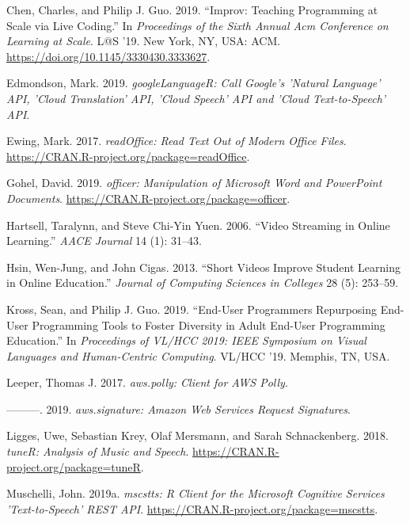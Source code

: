 \leavevmode\hypertarget{ref-ChenLAS2019}{}%
Chen, Charles, and Philip J. Guo. 2019. ``Improv: Teaching Programming
at Scale via Live Coding.'' In \emph{Proceedings of the Sixth Annual Acm
Conference on Learning at Scale}. L@S '19. New York, NY, USA: ACM.
\url{https://doi.org/10.1145/3330430.3333627}.

\leavevmode\hypertarget{ref-googleLanguageR}{}%
Edmondson, Mark. 2019. \emph{googleLanguageR: Call Google's 'Natural
Language' API, 'Cloud Translation' API, 'Cloud Speech' API and 'Cloud
Text-to-Speech' API}.

\leavevmode\hypertarget{ref-readOffice}{}%
Ewing, Mark. 2017. \emph{readOffice: Read Text Out of Modern Office
Files}. \url{https://CRAN.R-project.org/package=readOffice}.

\leavevmode\hypertarget{ref-officer}{}%
Gohel, David. 2019. \emph{officer: Manipulation of Microsoft Word and
PowerPoint Documents}. \url{https://CRAN.R-project.org/package=officer}.

\leavevmode\hypertarget{ref-hartsell2006video}{}%
Hartsell, Taralynn, and Steve Chi-Yin Yuen. 2006. ``Video Streaming in
Online Learning.'' \emph{AACE Journal} 14 (1): 31--43.

\leavevmode\hypertarget{ref-hsin2013short}{}%
Hsin, Wen-Jung, and John Cigas. 2013. ``Short Videos Improve Student
Learning in Online Education.'' \emph{Journal of Computing Sciences in
Colleges} 28 (5): 253--59.

\leavevmode\hypertarget{ref-Kross-2019}{}%
Kross, Sean, and Philip J. Guo. 2019. ``End-User Programmers Repurposing
End-User Programming Tools to Foster Diversity in Adult End-User
Programming Education.'' In \emph{Proceedings of VL/HCC 2019: IEEE
Symposium on Visual Languages and Human-Centric Computing}. VL/HCC '19.
Memphis, TN, USA.

\leavevmode\hypertarget{ref-aws.polly}{}%
Leeper, Thomas J. 2017. \emph{aws.polly: Client for AWS Polly}.

\leavevmode\hypertarget{ref-aws.signature}{}%
---------. 2019. \emph{aws.signature: Amazon Web Services Request
Signatures}.

\leavevmode\hypertarget{ref-tuneR}{}%
Ligges, Uwe, Sebastian Krey, Olaf Mersmann, and Sarah Schnackenberg.
2018. \emph{tuneR: Analysis of Music and Speech}.
\url{https://CRAN.R-project.org/package=tuneR}.

\leavevmode\hypertarget{ref-mscstts}{}%
Muschelli, John. 2019a. \emph{mscstts: R Client for the Microsoft
Cognitive Services 'Text-to-Speech' REST API}.
\url{https://CRAN.R-project.org/package=mscstts}.

